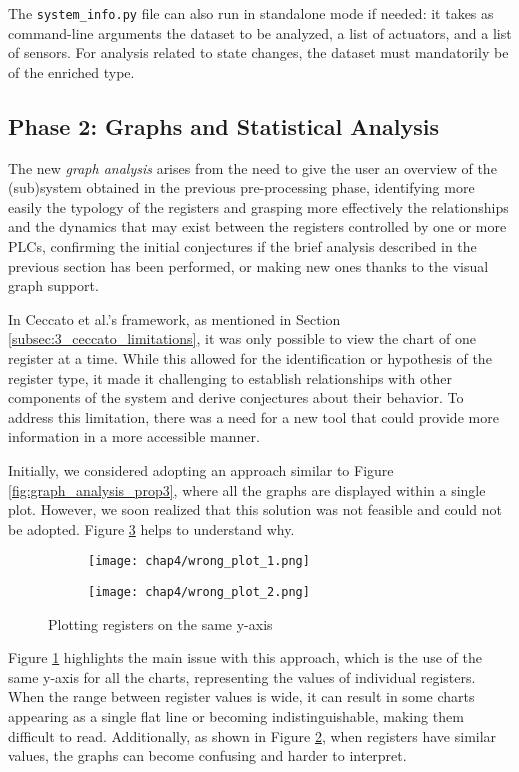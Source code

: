 \bigskip
The \texttt{system\_info.py} file can also run in standalone mode if needed: it takes as command-line arguments the dataset to be analyzed, a list of actuators, and a list of sensors. For analysis related to state changes, the dataset must mandatorily be of the enriched type.

\subsection{Phase 2: Graphs and Statistical Analysis}
\label{subsec:4_improve_graphs}

The new \textit{graph analysis} arises from the need to give the user an overview of the (sub)system obtained in the previous pre-processing phase, identifying more easily the typology of the registers and grasping more effectively the relationships and the dynamics that may exist between the registers controlled by one or more PLCs, confirming the initial conjectures if the brief analysis described in the previous section has been performed, or making new ones thanks to the visual graph support. 

\bigskip
In Ceccato et al.'s framework, as mentioned in Section \ref{subsec:3_ceccato_limitations}, it was only possible to view the chart of one register at a time. While this allowed for the identification or hypothesis of the register type, it made it challenging to establish relationships with other components of the system and derive conjectures about their behavior. To address this limitation, there was a need for a new tool that could provide more information in a more accessible manner.

\bigskip
Initially, we considered adopting an approach similar to Figure \ref{fig:graph_analysis_prop3}, where all the graphs are displayed within a single plot. However, we soon realized that this solution was not feasible and could not be adopted. Figure \ref{fig:4_plot_comparison_1} helps to understand why.  

\begin{figure}[H]
	\centering
	\begin{subfigure}{0.48\textwidth}
		\texttt{[image: chap4/wrong\_plot\_1.png]}
		\caption{}
		\label{subfig:4_wrong_plot}
	\end{subfigure}
	\hfill
	\begin{subfigure}{0.48\textwidth}
		\texttt{[image: chap4/wrong\_plot\_2.png]}
		\caption{}
		\label{subfig:4_wrong_plot_zoom}
	\end{subfigure}
	\caption{Plotting registers on the same y-axis}
	\label{fig:4_plot_comparison_1}
\end{figure}
Figure \ref{subfig:4_wrong_plot} highlights the main issue with this approach, which is the use of the same y-axis for all the charts, representing the values of individual registers. When the range between register values is wide, it can result in some charts appearing as a single flat line or becoming indistinguishable, making them difficult to read. Additionally, as shown in Figure \ref{subfig:4_wrong_plot_zoom}, when registers have similar values, the graphs can become confusing and harder to interpret.

